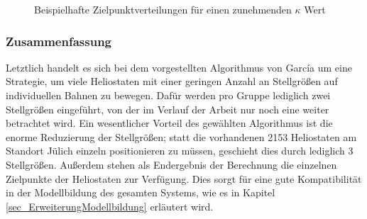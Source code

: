 \begin{figure}[h!]
    \centering
    \setlength{\fboxsep}{1pt}
    \setlength{\fboxrule}{1pt}
\caption[Beispielhafte Zielpunktverteilungen für einen zunehmenden $\kappa$ Wert]{Beispielhafte Zielpunktverteilungen für einen zunehmenden $\kappa$ Wert \cite[S.11]{Garcia2}}
    \label{fig_GarciaZielpunkte}
\end{figure}

\subsubsection*{Zusammenfassung} \label{subsubsec_Zusammenfassung}
Letztlich handelt es sich bei dem vorgestellten Algorithmus von García um eine Strategie, um viele Heliostaten mit einer geringen Anzahl an Stellgrößen auf individuellen Bahnen zu bewegen.
Dafür werden pro Gruppe lediglich zwei Stellgrößen eingeführt, von der im Verlauf der Arbeit nur noch eine weiter betrachtet wird.
Ein wesentlicher Vorteil des gewählten Algorithmus ist die enorme Reduzierung der Stellgrößen; statt die vorhandenen 2153 Heliostaten am Standort Jülich einzeln positionieren zu müssen, geschieht dies durch lediglich 3 Stellgrößen.
Außerdem stehen als Endergebnis der Berechnung die einzelnen Zielpunkte der Heliostaten zur Verfügung.
Dies sorgt für eine gute Kompatibilität in der Modellbildung des gesamten Systems, wie es in Kapitel \ref{sec_ErweiterungModellbildung} erläutert wird.



